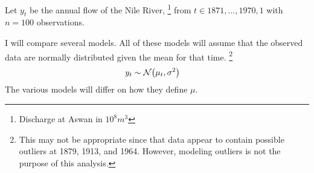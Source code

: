 Let $y_{t}$ be the annual flow of the Nile River,%
\footnote{Discharge at Aswan in $10^8 m^{3}$} %
from $t \in 1871, ..., 1970, 1$ with $n = 100$ observations.

I will compare several models.
All of these models will assume that the observed data are normally distributed given the mean for that time.%
\footnote{
  This may not be appropriate since that data appear to contain possible outliers at 1879, 1913, and 1964.
  However, modeling outliers is not the purpose of this analysis.
}
\begin{equation}
  \label{dlm:eq:10}
  \begin{aligned}[t]
    y_{t} &\sim \mathcal{N}\mathopen{}\left(\mu_{t}, \sigma^{2}\right)\mathclose{}
  \end{aligned}
\end{equation}
The various models will differ on how they define $\mu$.

